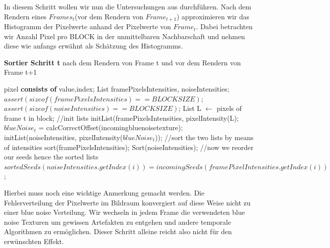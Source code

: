 In diesem Schritt wollen wir nun die Untersuchungen aus 
 durchführen. Nach dem Rendern eines
$Frames_{t}$(vor dem Rendern von $Frame_{t+1}$) approximieren wir das Histogramm
der Pixelwerte anhand der Pixelwerte von $Frame_{t}$. Dabei betrachten wir
Anzahl Pixel pro BLOCK in der unmittelbaren Nachbarschaft und nehmen diese
wie anfangs erwähnt als Schätzung des Histogramms.

\cite{hal02158423}
\begin{algorithm}[H]
    \caption{\textbf{Sortier Schritt t} nach dem Rendern von Frame t
    und vor dem Rendern von Frame t+1}
    \begin{algorithmic}[1]
        \State pixel \textbf{consists of} value,index;
        \State List framePixelsIntensities, noiseIntensities;
        \State $assert(sizeof(framePixelsIntensities)==BLOCKSIZE)$;
        \State $assert(sizeof(noiseIntensities)==BLOCKSIZE)$;
        \State List L $\leftarrow$ pixels of frame t in block;
        \State \hfill
        \State //init lists
        \State initList(framePixelsIntensities, pixelIntensity(L);
        \State $blueNoise_{t}$ = calcCorrectOffset(incomingbluenoisetexture);
        \State initList(noiseIntensities, pixelIntensity($blueNoise_{t}$));
        \State \hfill
        \State //sort the two lists by means of intensities
        \State sort(framePixelsIntensities);
        \State Sort(noiseIntensities);
        \State \hfill
        \State //now we reorder our seeds hence the sorted lists
        \State $sortedSeeds(noiseIntensities.getIndex(i)) = incomingSeeds(framePixelIntensities.getIndex(i))$;
        \EndFor
    \end{algorithmic}
    \label{alg:Sortier}
\end{algorithm}

Hierbei muss noch eine wichtige Anmerkung gemacht werden. Die Fehlerverteilung
der Pixelwerte im Bildraum konvergiert auf diese Weise nicht zu einer 
blue noise Verteilung. Wir wechseln in jedem Frame die 
verwendeten blue noise Texturen um gewissen Artefakten zu entgehen und 
andere temporale Algorithmen zu ermöglichen. Dieser Schritt alleine reicht
also nicht für den erwünschten Effekt.

